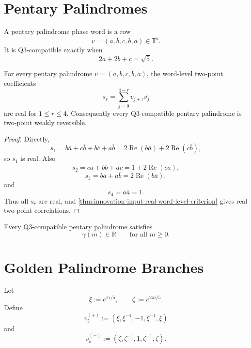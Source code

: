 \section{Pentary Palindromes}
\label{sec:innovation-input-pentary-palindromes}

\begin{definition}
\label{def:innovation-input-pentary-palindrome-phase-word}
A pentary palindrome phase word is a row
$$
v=(a,b,c,b,a)\in\mathbb T^5.
$$
It is Q3-compatible exactly when
$$
2a+2b+c=\sqrt5.
$$
\end{definition}

\begin{theorem}
\label{thm:innovation-input-pentary-palindrome-real-two-point}
For every pentary palindrome $v=(a,b,c,b,a)$, the word-level two-point
coefficients
$$
s_r=\sum_{j=0}^{4-r}v_{j+r}\overline{v_j}
$$
are real for $1\le r\le4$. Consequently every Q3-compatible pentary
palindrome is two-point weakly reversible.
\end{theorem}

\begin{proof}
Directly,
$$
s_1
=
b\overline a+c\overline b+b\overline c+a\overline b
=
2\operatorname{Re}(b\overline a)
+
2\operatorname{Re}(c\overline b),
$$
so $s_1$ is real. Also
$$
s_2
=
c\overline a+b\overline b+a\overline c
=
1+2\operatorname{Re}(c\overline a),
$$
$$
s_3
=
b\overline a+a\overline b
=
2\operatorname{Re}(b\overline a),
$$
and
$$
s_4=a\overline a=1.
$$
Thus all $s_r$ are real, and
\autoref{thm:innovation-input-real-word-level-criterion} gives real
two-point correlations.
\end{proof}

\begin{corollary}
\label{cor:innovation-input-pentary-palindrome-two-point-reversible}
Every Q3-compatible pentary palindrome satisfies
$$
\gamma(m)\in\mathbb R
\qquad
\text{for all }m\ge0.
$$
\end{corollary}

\section{Golden Palindrome Branches}
\label{sec:innovation-input-golden-palindrome-branches}

\begin{definition}
\label{def:innovation-input-golden-palindrome-branches}
Let
$$
\xi:=e^{\pi i/5},
\qquad
\zeta:=e^{2\pi i/5}.
$$
Define
$$
v_5^{(+)}
:=
(\xi,\xi^{-1},-1,\xi^{-1},\xi)
$$
and
$$
v_5^{(-)}
:=
(\zeta,\zeta^{-1},1,\zeta^{-1},\zeta).
$$
\end{definition}


